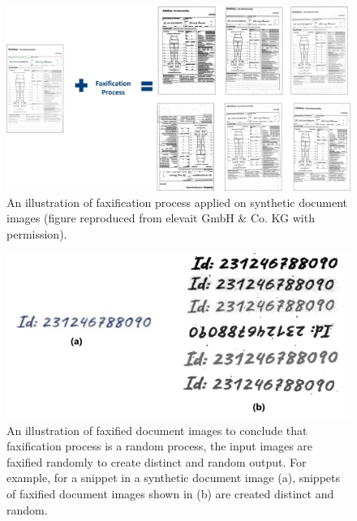 \vspace*{2cm}
\begin{figure}[H]
        \begin{center}
	    \includegraphics[scale=0.25]{images/Evaluation/FaxificationProcess.jpg}
	    \caption[An illustration of faxification process applied on synthetic document images.]{An illustration of faxification process applied on synthetic document images (figure reproduced from elevait GmbH \& Co. KG with permission).}
	    \label{fig:FaxificationProcess}
	    \end{center}
\end{figure}


\vspace*{1.5cm}
\begin{figure}[H]
        \begin{center}
	    \includegraphics[scale=0.15]{images/Evaluation/FaxificationProcessZoomed.jpg}
	    \caption[An illustration of faxified document images to conclude that faxification process is a random process, the input images are faxified randomly to create distinct output.]{An illustration of faxified document images to conclude that faxification process is a random process, the input images are faxified randomly to create distinct and random output. For example, for a snippet in a synthetic document image (a), snippets of faxified document images shown in (b) are created distinct and random.}
	    \label{fig:FaxificationProcessZoomed}
	    \end{center}
\end{figure}


